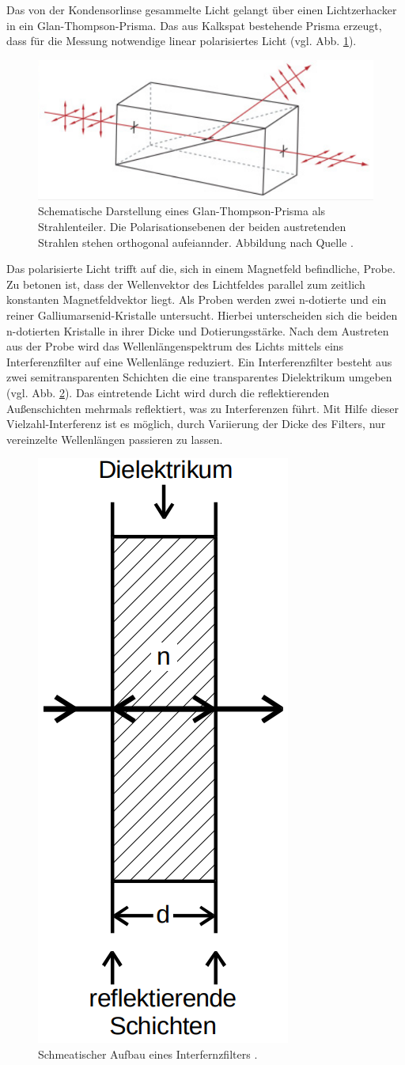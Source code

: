 Das von der Kondensorlinse gesammelte Licht gelangt über einen Lichtzerhacker in
ein Glan-Thompson-Prisma. Das aus Kalkspat bestehende Prisma erzeugt, dass
für die Messung notwendige linear polarisiertes Licht (vgl. Abb. \ref{fig:glan_thompson_prisma}).
\begin{figure}
\centering
\includegraphics[width=0.5\linewidth]{./content/images/glan_thompson_prisma.png}
\caption{Schematische Darstellung eines Glan-Thompson-Prisma als Strahlenteiler.
Die Polarisationsebenen der beiden austretenden Strahlen stehen orthogonal aufeiannder.
Abbildung nach Quelle \cite{glan_thompson_prisma}.}
\label{fig:glan_thompson_prisma}
\end{figure}
Das polarisierte Licht trifft auf die, sich in einem Magnetfeld befindliche,
Probe. Zu betonen ist, dass der Wellenvektor des Lichtfeldes parallel zum zeitlich konstanten Magnetfeldvektor
liegt. Als Proben werden zwei n-dotierte
und ein reiner Galliumarsenid-Kristalle untersucht. Hierbei unterscheiden sich die
beiden n-dotierten Kristalle in ihrer Dicke und Dotierungsstärke. Nach dem Austreten aus
der Probe wird das Wellenlängenspektrum des Lichts mittels
eins Interferenzfilter auf eine Wellenlänge reduziert. Ein Interferenzfilter
besteht aus zwei semitransparenten Schichten die eine transparentes Dielektrikum
umgeben (vgl. Abb. \ref{fig:interferenzfilter}). Das eintretende Licht wird durch die reflektierenden
Außenschichten mehrmals reflektiert, was zu Interferenzen führt.
Mit Hilfe dieser Vielzahl-Interferenz ist es möglich, durch Variierung der
Dicke des Filters, nur vereinzelte Wellenlängen passieren zu lassen.
\begin{figure}
\centering
\includegraphics[width=0.35\linewidth]{./content/images/interferenzfilter.png}
\caption{Schmeatischer Aufbau eines Interfernzfilters \cite{anleitungv46}.}
\label{fig:interferenzfilter}
\end{figure}
